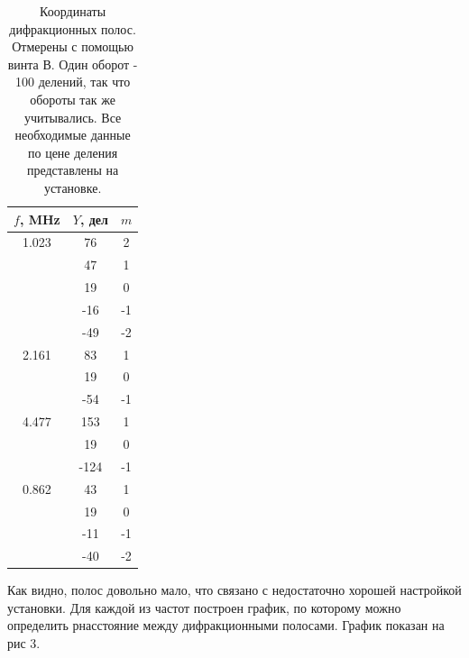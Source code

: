 \documentclass[a4paper, 14pt]{extarticle}%
\newcommand\ECaption[1]{%
     \captionsetup{font=footnotesize}%
     \caption{#1}}
\begin{document}
\begin{table}[h!]
\begin{center}

\begin{tabular}{|c|c|c|}
\hline
\rowcolor[HTML]{9698ED} 
$f$, MHz & $Y$, дел & $m$  \\ \hline
\rowcolor[HTML]{9698ED} 
1.023  & 76     & 2  \\ \hline
       & 47     & 1  \\ \cline{2-3} 
       & 19     & 0  \\ \cline{2-3} 
       & -16    & -1 \\ \cline{2-3} 
       & -49    & -2 \\ \hline
\rowcolor[HTML]{9698ED} 
2.161  & 83     & 1  \\ \cline{2-3} 
       & 19     & 0  \\ \cline{2-3} 
       & -54    & -1 \\ \hline
\rowcolor[HTML]{9698ED} 
4.477  & 153    & 1  \\ \cline{2-3} 
       & 19     & 0  \\ \cline{2-3} 
       & -124   & -1 \\ \hline
\rowcolor[HTML]{9698ED} 
0.862  & 43     & 1  \\ \cline{2-3} 
       & 19     & 0  \\ \cline{2-3} 
       & -11    & -1 \\ \cline{2-3} 
       & -40    & -2 \\ \hline
\end{tabular}
\ECaption{Координаты дифракционных полос. Отмерены с помощью винта В. Один оборот - 100 делений, так что обороты так же учитывались. Все необходимые данные по цене деления представлены на установке.}
\end{center}
\end{table} 

Как видно, полос довольно мало, что связано с недостаточно хорошей настройкой установки. Для каждой из частот построен график, по которому можно определить рнасстояние между дифракционными полосами. График показан на рис 3.
\end{document}
